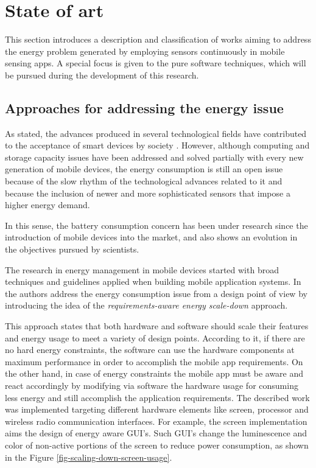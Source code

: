 \section{State of art} 
\label{sec:state_of_art}
This section introduces a description and classification of works aiming to address the energy problem generated by employing sensors continuously in mobile sensing apps.
A special focus is given to the pure software techniques, which will be pursued during the development of this research.

\subsection{Approaches for addressing the energy issue}

As stated, the advances produced in several technological fields have contributed to the acceptance of smart devices by society \cite{Lane2010,Ra2012}.
However, although computing and storage capacity issues have been addressed and solved partially with every new generation of mobile devices, the energy consumption is still an open issue because of the slow rhythm of the technological advances related to it and because the inclusion of newer and more sophisticated sensors that impose a higher energy demand.

In this sense, the battery consumption concern has been under research since the introduction of mobile devices into the market, and also shows an evolution in the objectives pursued by scientists. 

The research in energy management in mobile devices started with broad techniques and guidelines applied when building mobile application systems.
In \cite{Mayo2004} the authors address the energy consumption issue from a design point of view by introducing the idea of the \emph{requirements-aware energy scale-down} approach. 

This approach states that both hardware and software should scale their features and energy usage to meet a variety of design points.
According to it, if there are no hard energy constraints, the software can use the hardware components at maximum performance in order to accomplish the mobile app requirements.
On the other hand, in case of energy constraints the mobile app must be aware and react accordingly by modifying via software the hardware usage for consuming less energy and still accomplish the application requirements.
The described work was implemented targeting different hardware elements like screen, processor and wireless radio communication interfaces.
For example, the screen implementation aims the design of energy aware GUI's.
Such GUI's change the luminescence and color of non-active portions of the screen to reduce power consumption, as shown in the Figure \ref{fig-scaling-down-screen-usage}.

